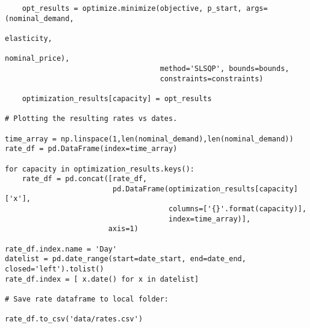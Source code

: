\begin{verbatim}
    opt_results = optimize.minimize(objective, p_start, args=(nominal_demand,
                                                              elasticity,
                                                              nominal_price),
                                    method='SLSQP', bounds=bounds,
                                    constraints=constraints)

    optimization_results[capacity] = opt_results
    
# Plotting the resulting rates vs dates.

time_array = np.linspace(1,len(nominal_demand),len(nominal_demand))
rate_df = pd.DataFrame(index=time_array)

for capacity in optimization_results.keys():
    rate_df = pd.concat([rate_df,
                         pd.DataFrame(optimization_results[capacity]['x'],
                                      columns=['{}'.format(capacity)],
                                      index=time_array)],
                        axis=1)

rate_df.index.name = 'Day'
datelist = pd.date_range(start=date_start, end=date_end, closed='left').tolist()
rate_df.index = [ x.date() for x in datelist]

# Save rate dataframe to local folder:

rate_df.to_csv('data/rates.csv')


\end{verbatim}

